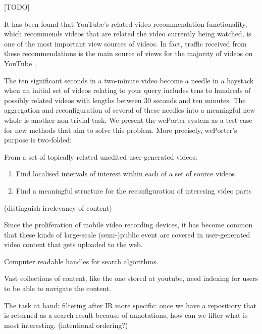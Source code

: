 [TODO]

It has been found that YouTube's related video recommendation functionality, which recommends videos that are related the video currently being watched, is one of the most important view sources of videos. In fact, traffic received from these recommendations is the main source of views for the majority of videos on YouTube \cite{Zhou:2010ut}.


The ten significant seconds in a two-minute video become a needle in a haystack when an initial set of videos relating to your query includes tens to hundreds of possibly related videos with lengths between 30 seconds and ten minutes. The  aggregation and reconfiguration of several of these needles into a meaningful new whole is another non-trivial task. We present the wePorter system as a test case for new methods that aim to solve this problem. More precisely, wePorter's purpose is two-folded:

From a set of topically related unedited user-generated videos:
\begin{enumerate}
  \item Find localised intervals of interest within each of a set of source videos
  \item Find a meaningful structure for the reconfiguration of interesing video parts
\end{enumerate}
(distinguish irrelevancy of content)













Since the proliferation of mobile video recording devices, it has become common that these kinds of large-scale (semi-)public event are covered in user-generated video content that gets uploaded to the web. 


Computer readable  handles for search algorithms. 


Vast collections of content, like the one stored at youtube, need indexing for users to be able to navigate the content.  








The task at hand: filtering after IR
more specific: once we have a repositiory that is returned as a search result because of annotations, how can we filter what is most interesting. (intentional ordering?)

